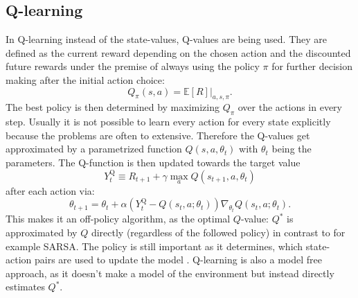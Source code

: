 \subsection{Q-learning}
In Q-learning \cite{DBLP:journals/corr/HasseltGS15} instead of the state-values, Q-values are being used. They are defined as the current reward depending on the chosen action and the discounted future rewards under the premise of always using the policy $\pi$ for further decision making after the initial action choice:
\begin{equation}
Q_\pi(s,a)=\mathbb{E}\left[R\right]|_{a,s,\pi}.
\end{equation} 
The best policy is then determined by maximizing $Q_\pi$ over the actions in every step.
Usually it is not possible to learn every action for every state explicitly because the problems are often to extensive. Therefore the Q-values get approximated by a parametrized function $Q(s,a,\theta_t)$ with $\theta_t$ being the parameters. The Q-function is then updated towards the target value
\begin{equation}\label{eq:Q-target}Y_{t}^{\mathrm{Q}} \equiv R_{t+1}+\gamma \max _{a} Q\left(s_{t+1}, a , \theta_{t}\right)
\end{equation}
after each action via:
\begin{equation}
\theta_{t+1}=\theta_{t}+\alpha\left(Y_{t}^{\mathrm{Q}}-Q\left(s_{t}, a; \theta_{t}\right)\right) \nabla_{\theta_{t}} Q\left(s_{t}, a ; \theta_{t}\right).
\end{equation}
This makes it an off-policy algorithm, as the optimal $Q$-value: $Q^*$ is approximated by $Q$ directly (regardless of the followed policy) in contrast to for example SARSA. The policy is still important as it determines, which state-action pairs are used to update the model \cite{Sutton:1998:IRL:551283}. 
Q-learning is also a model free approach, as it doesn't make a model of the environment but instead directly estimates $Q^*$.\\
